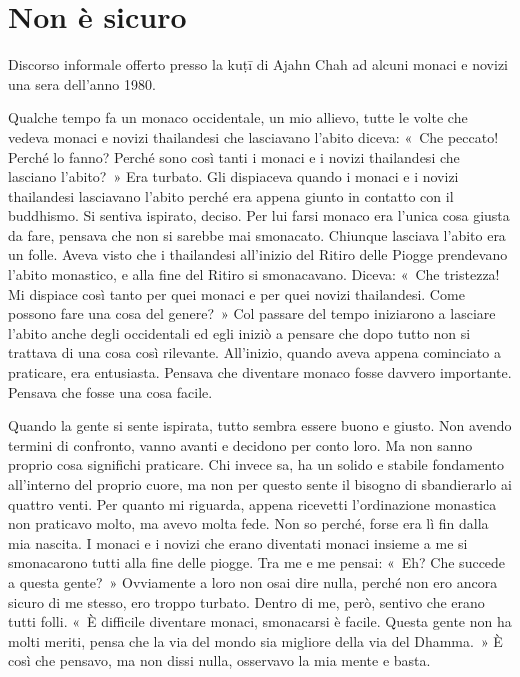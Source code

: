 \chapter{Non è sicuro}

\begin{openingQuote}
  \centering

  Discorso informale offerto presso la kuṭī di Ajahn Chah ad alcuni
  monaci e novizi una sera dell'anno 1980.
\end{openingQuote}

Qualche tempo fa un monaco occidentale, un mio allievo, tutte le volte
che vedeva monaci e novizi thailandesi che lasciavano l'abito diceva:
«~Che peccato! Perché lo fanno? Perché sono così tanti i monaci e i
novizi thailandesi che lasciano l'abito?~» Era turbato. Gli dispiaceva
quando i monaci e i novizi thailandesi lasciavano l'abito perché era
appena giunto in contatto con il buddhismo. Si sentiva ispirato, deciso.
Per lui farsi monaco era l'unica cosa giusta da fare, pensava che non si
sarebbe mai smonacato. Chiunque lasciava l'abito era un folle. Aveva
visto che i thailandesi all'inizio del Ritiro delle Piogge prendevano
l'abito monastico, e alla fine del Ritiro si smonacavano. Diceva: «~Che
tristezza! Mi dispiace così tanto per quei monaci e per quei novizi
thailandesi. Come possono fare una cosa del genere?~» Col passare del
tempo iniziarono a lasciare l'abito anche degli occidentali ed egli
iniziò a pensare che dopo tutto non si trattava di una cosa così
rilevante. All'inizio, quando aveva appena cominciato a praticare, era
entusiasta. Pensava che diventare monaco fosse davvero importante.
Pensava che fosse una cosa facile.

Quando la gente si sente ispirata, tutto sembra essere buono e giusto.
Non avendo termini di confronto, vanno avanti e decidono per conto loro.
Ma non sanno proprio cosa significhi praticare. Chi invece sa, ha un
solido e stabile fondamento all'interno del proprio cuore, ma non per
questo sente il bisogno di sbandierarlo ai quattro venti. Per quanto mi
riguarda, appena ricevetti l'ordinazione monastica non praticavo molto,
ma avevo molta fede. Non so perché, forse era lì fin dalla mia nascita.
I monaci e i novizi che erano diventati monaci insieme a me si
smonacarono tutti alla fine delle piogge. Tra me e me pensai: «~Eh? Che
succede a questa gente?~» Ovviamente a loro non osai dire nulla, perché
non ero ancora sicuro di me stesso, ero troppo turbato. Dentro di me,
però, sentivo che erano tutti folli. «~È difficile diventare monaci,
smonacarsi è facile. Questa gente non ha molti meriti, pensa che la via
del mondo sia migliore della via del Dhamma.~» È così che pensavo, ma
non dissi nulla, osservavo la mia mente e basta.

